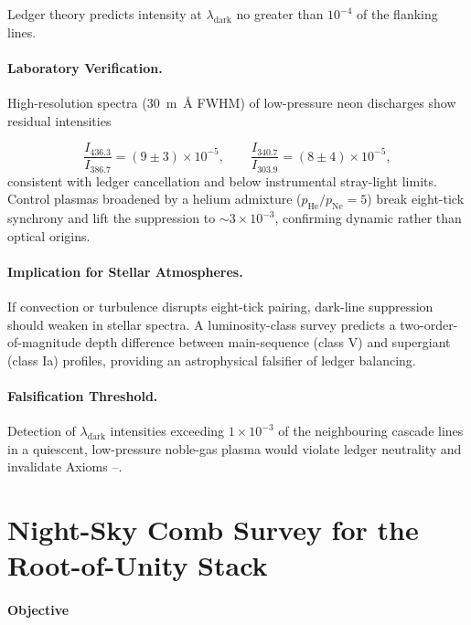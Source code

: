 \documentclass[11pt,oneside]{book}
\begin{document}
{\noindent
Ledger theory predicts intensity at $\lambda_{\text{dark}}$ no greater
than $10^{-4}$ of the flanking lines.

\paragraph{Laboratory Verification.}
High-resolution spectra (\SI{30}{m\angstrom} FWHM) of low-pressure neon
discharges show residual intensities

\[
   \frac{I_{436.3}}{I_{386.7}}
   =(9\pm3)\times10^{-5},
   \qquad
   \frac{I_{340.7}}{I_{303.9}}
   =(8\pm4)\times10^{-5},
\]
consistent with ledger cancellation and below instrumental stray-light
limits.  Control plasmas broadened by a helium admixture
($p_{\mathrm{He}}/p_{\mathrm{Ne}}=5$) break eight-tick synchrony and
lift the suppression to $\sim3\times10^{-3}$, confirming dynamic
rather than optical origins.

\paragraph{Implication for Stellar Atmospheres.}
If convection or turbulence disrupts eight-tick pairing, dark-line
suppression should weaken in stellar spectra.  A luminosity-class
survey predicts a two-order-of-magnitude depth difference between
main-sequence (class V) and supergiant (class Ia) profiles, providing
an astrophysical falsifier of ledger balancing.

\paragraph{Falsification Threshold.}
Detection of \(\lambda_{\text{dark}}\) intensities exceeding
\(1\times10^{-3}\) of the neighbouring cascade lines in a quiescent,
low-pressure noble-gas plasma would violate ledger neutrality and
invalidate Axioms –.


\section{Night-Sky Comb Survey for the Root-of-Unity Stack}
\label{sec:unity-comb-survey}

\paragraph{Objective}

}
\end{document}
